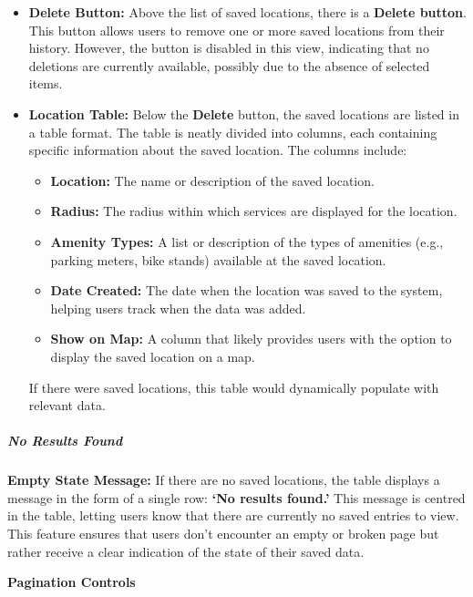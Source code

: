\begin{itemize}
    \item{} \textbf{Delete Button:} Above the list of saved locations, there is
    a \textbf{Delete button}. This button allows users to remove one or more
    saved locations from their history. However, the button is disabled in this
    view, indicating that no deletions are currently available, possibly due to
    the absence of selected items.
    \item{} \textbf{Location Table:} Below the \textbf{Delete} button, the saved
    locations are listed in a table format. The table is neatly divided into
    columns, each containing specific information about the saved location. The
    columns include:
    \begin{itemize}
        \item{} \textbf{Location:} The name or description of the saved
        location.
        \item{} \textbf{Radius:} The radius within which services are displayed
        for the location.
        \item{} \textbf{Amenity Types:} A list or description of the types of
        amenities (e.g., parking meters, bike stands) available at the saved
        location.
        \item{} \textbf{Date Created:} The date when the location was saved to
        the system, helping users track when the data was added.
        \item{} \textbf{Show on Map:} A column that likely provides users with
        the option to display the saved location on a map.
    \end{itemize}

    If there were saved locations, this table would dynamically populate with
    relevant data.

\end{itemize}

\subparagraph{No Results Found}\mbox{}

\textbf{Empty State Message:} If there are no saved locations, the table
displays a message in the form of a single row: \textbf{`No results found.'}
This message is centred in the table, letting users know that there are
currently no saved entries to view. This feature ensures that users don't
encounter an empty or broken page but rather receive a clear indication of the
state of their saved data.

\textbf{Pagination Controls}

